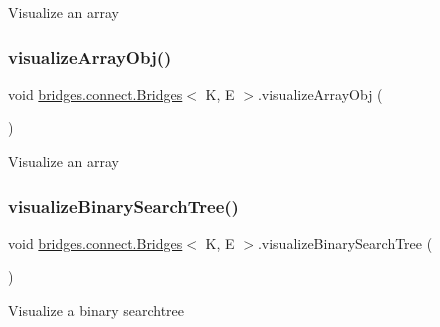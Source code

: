 Visualize an array \hypertarget{classbridges_1_1connect_1_1_bridges_a7533ebb339527a3a824fc7af21a1d5c9}{}\label{classbridges_1_1connect_1_1_bridges_a7533ebb339527a3a824fc7af21a1d5c9} 
\subsubsection{\texorpdfstring{visualize\+Array\+Obj()}{visualizeArrayObj()}}
{\footnotesize\ttfamily void \hyperlink{classbridges_1_1connect_1_1_bridges}{bridges.\+connect.\+Bridges}$<$ K, E $>$.visualize\+Array\+Obj (\begin{DoxyParamCaption}{ }\end{DoxyParamCaption})\hspace{0.3cm}{\ttfamily [protected]}}

Visualize an array \hypertarget{classbridges_1_1connect_1_1_bridges_a283d29561d78a890f01c8735c18d17d0}{}\label{classbridges_1_1connect_1_1_bridges_a283d29561d78a890f01c8735c18d17d0} 
\subsubsection{\texorpdfstring{visualize\+Binary\+Search\+Tree()}{visualizeBinarySearchTree()}}
{\footnotesize\ttfamily void \hyperlink{classbridges_1_1connect_1_1_bridges}{bridges.\+connect.\+Bridges}$<$ K, E $>$.visualize\+Binary\+Search\+Tree (\begin{DoxyParamCaption}{ }\end{DoxyParamCaption})\hspace{0.3cm}{\ttfamily [protected]}}

Visualize a binary searchtree \hypertarget{classbridges_1_1connect_1_1_bridges_ac1ac1db8cf7123aefb83ab05af83375d}{}\label{classbridges_1_1connect_1_1_bridges_ac1ac1db8cf7123aefb83ab05af83375d} 
